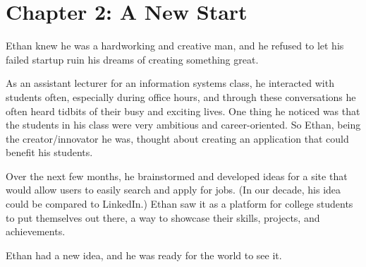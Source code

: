\documentclass[a4paper,12pt,twoside]{book}
\begin{document}
\chapter{Chapter 2: A New Start}

Ethan knew he was a hardworking and creative man, and he refused to let his failed startup ruin his dreams of creating something great. 

As an assistant lecturer for an information systems class, he interacted with students often, especially during office hours, and through these conversations he often heard tidbits of their busy and exciting lives. One thing he noticed was that the students in his class were very ambitious and career-oriented. So Ethan, being the creator/innovator he was, thought about creating an application that could benefit his students. 

Over the next few months, he brainstormed and developed ideas for a site that would allow users to easily search and apply for jobs. (In our decade, his idea could be compared to LinkedIn.) Ethan saw it as a platform for college students to put themselves out there, a way to showcase their skills, projects, and achievements. 

Ethan had a new idea, and he was ready for the world to see it. 
 
\end{document}
